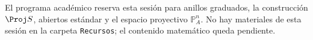 \begin{nota}
El programa académico reserva esta sesión para anillos graduados, la construcción $\Proj S$, abiertos estándar y el espacio proyectivo $\mathbb P^n_A$. No hay materiales de esta sesión en la carpeta \texttt{Recursos}; el contenido matemático queda pendiente.
\end{nota}
